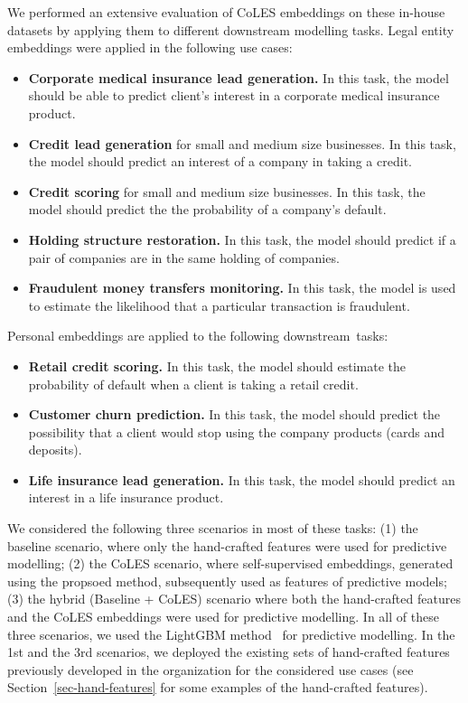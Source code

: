\documentclass[sigconf, anonymous]{acmart}
\begin{document}
We performed an extensive evaluation of CoLES embeddings on these in-house datasets by applying them to different downstream modelling tasks.
Legal entity embeddings were applied in the following use cases:
\begin{itemize}
    \item \textbf{Corporate medical insurance lead generation.} In this task, the model should be able to predict client's interest in a corporate medical insurance product.
    \item \textbf{Credit lead generation} for small and medium size businesses. In this task, the model should predict an interest of a company in taking a credit.
    \item \textbf{Credit scoring} for small and medium size businesses. In this task, the model should predict the the probability of a company's default.
    \item \textbf{Holding structure restoration.} In this task, the model should predict if a pair of companies are in the same holding of companies.
    \item \textbf{Fraudulent money transfers monitoring.} In this task, the model is used to estimate the likelihood that a particular transaction is fraudulent.
\end{itemize}
Personal embeddings are applied to the following downstream~tasks:
\begin{itemize}
    \item \textbf{Retail credit scoring.} In this task, the model should estimate the probability of default when a client is taking a retail credit.
    \item \textbf{Customer churn prediction.} In this task, the model should predict the possibility that a client would stop using the company products (cards and deposits).
    \item \textbf{Life insurance lead generation.} In this task, the model should predict an interest in a life insurance product.
\end{itemize}


We considered the following three scenarios in most of these tasks: (1) the baseline scenario, where only the hand-crafted features were used for predictive modelling; (2) the CoLES scenario, where self-supervised embeddings, generated using the propsoed method, subsequently used as features of predictive models; (3) the hybrid (Baseline + CoLES) scenario where both the hand-crafted features and the CoLES embeddings were used for predictive modelling. In all of these three scenarios, we used the LightGBM method~\citep{Ke2017LightGBMAH} for predictive modelling.
In the 1st and the 3rd scenarios, we deployed the existing sets of hand-crafted features previously developed in the organization for the considered use cases (see Section~\ref{sec-hand-features} for some examples of the hand-crafted features).
\end{document}

